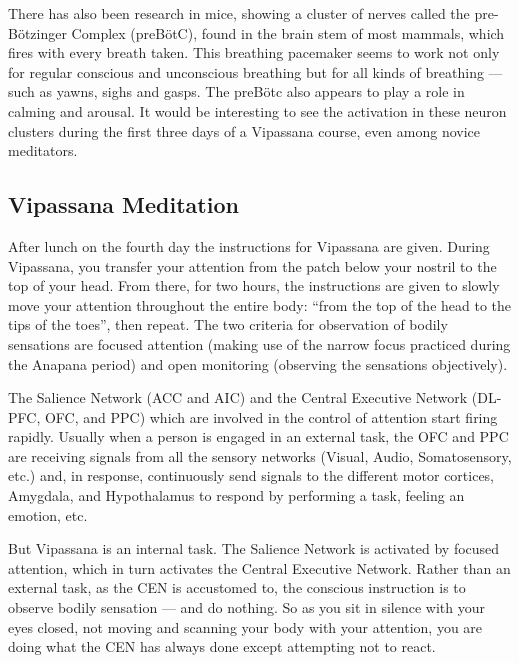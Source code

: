 \documentclass[a4paper, amsfonts, amssymb, amsmath, reprint, showkeys, nofootinbib, twoside]{revtex4-1}
\begin{document}
There has also been research in mice, showing a cluster of nerves called the
pre-Bötzinger Complex (preBötC), found in the brain stem of most mammals, which fires
with every breath taken. This breathing pacemaker seems to work not only for regular
conscious and unconscious breathing but for all kinds of breathing --- such as yawns,
sighs and gasps. The preBötc also appears to play a role in calming and
arousal. \cite{prebotcgeneration} It would be interesting to see the activation in
these neuron clusters during the first three days of a Vipassana course, even among
novice meditators.

\subsection{Vipassana Meditation}

After lunch on the fourth day the instructions for Vipassana are given. During
Vipassana, you transfer your attention from the patch below your nostril to the top
of your head. From there, for two hours, the instructions are given to slowly move
your attention throughout the entire body: ``from the top of the head to the tips of
the toes'', then repeat. The two criteria for observation of bodily sensations are
focused attention (making use of the narrow focus practiced during the Anapana
period) and open monitoring (observing the sensations objectively).

The Salience Network (ACC and AIC) and the Central Executive Network (DL-PFC, OFC,
and PPC) which are involved in the control of attention start firing rapidly. Usually
when a person is engaged in an external task, the OFC and PPC are receiving signals
from all the sensory networks (Visual, Audio, Somatosensory, etc.) and, in response,
continuously send signals to the different motor cortices, Amygdala, and Hypothalamus to
respond by performing a task, feeling an emotion, etc.

But Vipassana is an internal task. The Salience Network is activated by focused
attention, which in turn activates the Central Executive Network. Rather than an
external task, as the CEN is accustomed to, the conscious instruction is to observe
bodily sensation --- and do nothing. So as you sit in silence with your eyes closed,
not moving and scanning your body with your attention, you are doing what the CEN has
always done except attempting not to react.
\end{document}
